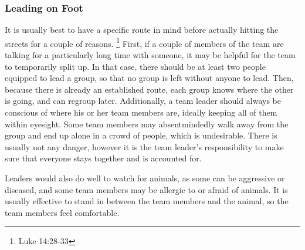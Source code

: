 \subsubsection{Leading on Foot}

    \qLeaders
    It is usually best to have a specific route in mind before actually hitting the streets for a couple of reasons.
    \footnote{Luke 14:28-33}
    First, if a couple of members of the team are talking for a particularly long time with someone, it may be helpful for the team to temporarily split up.
    In that case, there should be at least two people equipped to lead a group, so that no group is left without anyone to lead.
    Then, because there is already an established route, each group knows where the other is going, and can regroup later.
    Additionally, a team leader should always be conscious of where his or her team members are, ideally keeping all of them within eyesight.
    Some team members may absentmindedly walk away from the group and end up alone in a crowd of people, which is undesirable.
    There is usually not any danger, however it is the team leader's responsibility to make sure that everyone stays together and is accounted for.
    \par Leaders would also do well to watch for animals, as some can be aggressive or diseased, and some team members may be allergic to or afraid of animals.
    It is usually effective to stand in between the team members and the animal, so the team members feel comfortable.

